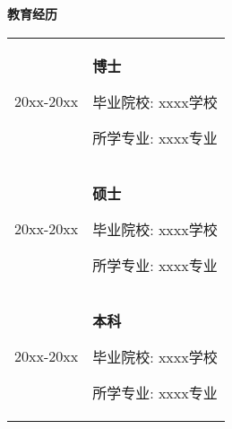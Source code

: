 \begin{flushleft}
  \Large\textbf{教育经历}
  \\[4mm]
  \normalsize{
    \begin{tabular}{p{} p{}}
      20xx-20xx & \textbf{博士}
                  \par 毕业院校: xxxx学校
                  \par 所学专业: xxxx专业\\[4mm]
      20xx-20xx & \textbf{硕士}
                  \par 毕业院校: xxxx学校
                  \par 所学专业: xxxx专业\\[4mm]
      20xx-20xx & \textbf{本科}
                  \par 毕业院校: xxxx学校
                  \par 所学专业: xxxx专业\\[4mm]
    \end{tabular}
  }
\end{flushleft}
